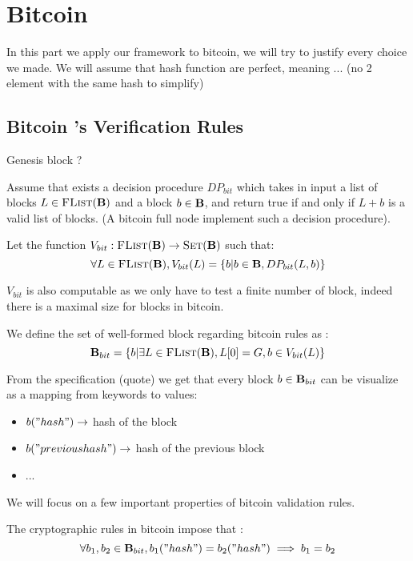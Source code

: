 

\section{Bitcoin}
In this part we apply our framework to bitcoin, we will try to justify every choice we made. 
We will assume that hash function are perfect, meaning ... (no 2 element with the same hash to simplify)

\subsection{Bitcoin 's Verification Rules}
Genesis block ?

Assume that exists a decision procedure $DP_{bit}$ which takes in input a list of blocks $L \in \text{\sc FList}(\text{\bf B})$ and a block $b \in \text{\bf B}$, and return true if and only if $L+b$ is a valid list of blocks. (A bitcoin full node implement such a decision procedure).

Let the function $V_{bit} : \text{\sc FList}(\text{\bf B}) \rightarrow \text{\sc Set}(\text{\bf B})$ such that:
$$\forall L \in \text{\sc FList}(\text{\bf B}), V_{bit}(L) = \{ b | b \in \text{\bf B}, DP_{bit}(L,b) \}$$

\begin{myrem}
	$V_{bit}$ is also computable as we only have to test a finite number of block, indeed there is a maximal size for blocks in bitcoin.
\end{myrem}

We define the set of well-formed block regarding bitcoin rules as : 
$$\text{\bf B}_{bit} = \{b| \exists L \in \text{\sc FList}(\text{\bf B}), L[0] = G, b \in V_{bit}(L) \}$$

\begin{mylem*}
	From the specification (quote) we get that every block $b \in \text{\bf B}_{bit}$ can be visualize as a mapping from keywords to values: 
	\begin{itemize}
		\item $b("hash") \rightarrow$ hash of the block
		\item $b("previous hash") \rightarrow$ hash of the previous block
		\item ...
	\end{itemize}
\end{mylem*}

We will focus on a few important properties of bitcoin validation rules.
\begin{mylem*}
	The cryptographic rules in bitcoin impose that :
	$$ \forall b_1,b_2 \in \text{\bf B}_{bit}, b_1("hash")=b_2("hash") \implies b_1 = b_2 $$
\end{mylem*}

